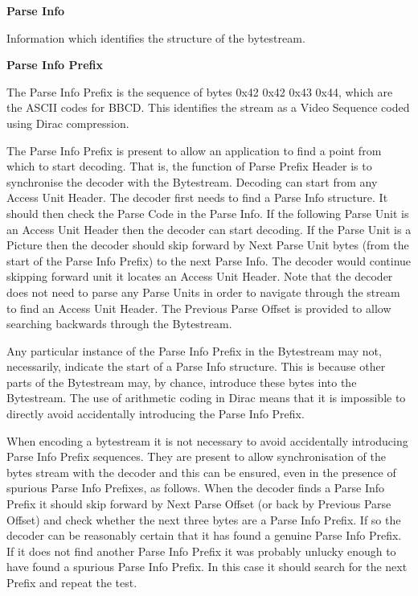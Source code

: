\textbf{Parse Info}

Information which identifies the structure of the bytestream.

\textbf{Parse Info Prefix}

The Parse Info Prefix is the sequence of bytes 0x42  0x42  0x43  0x44,
which are the ASCII codes for BBCD.  This identifies the stream as a
Video Sequence coded using Dirac compression.

The Parse Info Prefix is present to allow an application to find a point
from which to start decoding. That is, the function of Parse Prefix
Header is to synchronise the decoder with the Bytestream. Decoding can
start from any Access Unit Header. The decoder first needs to find a
Parse Info structure. It should then check the Parse Code in the Parse
Info. If the following Parse Unit is an Access Unit Header then the
decoder can start decoding. If the Parse Unit is a Picture then the
decoder should skip forward by Next Parse Unit bytes (from the start of
the Parse Info Prefix) to the next Parse Info. The decoder would
continue skipping forward unit it locates an Access Unit Header. Note
that the decoder does not need to parse any Parse Units in order to
navigate through the stream to find an Access Unit Header. The Previous
Parse Offset is provided to allow searching backwards through the
Bytestream.

Any particular instance of the Parse Info Prefix in the Bytestream may
not, necessarily, indicate the start of a Parse Info structure. This is
because other parts of the Bytestream may, by chance, introduce these
bytes into the Bytestream. The use of arithmetic coding in Dirac means
that it is impossible to directly avoid accidentally introducing the
Parse Info Prefix.

When encoding a bytestream it is not necessary to avoid accidentally
introducing Parse Info Prefix sequences. They are present to allow
synchronisation of the bytes stream with the decoder and this can be
ensured, even in the presence of spurious Parse Info Prefixes, as
follows. When the decoder finds a Parse Info Prefix it should skip
forward by Next Parse Offset (or back by Previous Parse Offset) and
check whether the next three bytes are a Parse Info Prefix. If so the
decoder can be reasonably certain that it has found a genuine Parse Info
Prefix. If it does not find another Parse Info Prefix it was probably
unlucky enough to have found a spurious Parse Info Prefix. In this case
it should search for the next Prefix and repeat the test.

